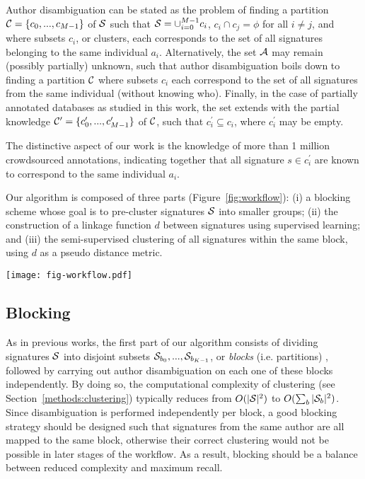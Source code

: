 \documentclass[runningheads,a4paper]{llncs}
\makeatletter
\newcommand*{\ie}{i.e.\@\xspace}
\makeatother
\begin{document}
Author disambiguation can be stated as the problem of
finding a partition ${\cal C} = \{ c_0, ..., c_{M-1} \}$ of ${\cal S}$ such
that ${\cal S} = \cup_{i=0}^{M-1} c_i$, $c_i \cap c_j = \phi$ for all $i \neq
j$, and where subsets $c_i$, or clusters, each corresponds to the set of all
signatures belonging to the same individual $a_i$. Alternatively, the set
${\cal A}$ may remain (possibly partially) unknown, such that author
disambiguation boils down to finding a partition ${\cal C}$ where
subsets $c_i$  each correspond to the set of all signatures from the same
individual (without knowing who). Finally, in the case of partially annotated databases as studied in
this work, the set extends with the partial knowledge ${\cal C}^\prime = \{ c_0^\prime, ..., c_{M-1}^\prime \}$ of ${\cal C}$,
such that $c_i^\prime \subseteq c_i$, where $c_i^\prime$ may be empty.

The distinctive aspect of our work is the
knowledge of more than 1 million crowdsourced annotations, indicating together that all signature $s \in
c_i^\prime$ are known to correspond to the same individual $a_i$.

Our algorithm is composed of three parts (Figure~\ref{fig:workflow}): (i) a blocking
scheme whose goal is to pre-cluster signatures ${\cal S}$ into smaller groups; (ii) the construction of a linkage function
$d$ between signatures using supervised learning; and (iii) the
semi-supervised clustering of all signatures within the same block, using $d$ as a pseudo distance metric.


\begin{figure*}
\centering
\texttt{[image: fig-workflow.pdf]}
\caption{Pipeline for author disambiguation: (a)
signatures are \textit{blocked} to reduce computational complexity, (b) a linkage
function is built with supervised learning, (c) independently within each block, signatures
are grouped using hierarchical agglomerative clustering.}
\label{fig:workflow}
\end{figure*}

\subsection{Blocking}
\label{methods:blocking}

As in previous works, the first part of our algorithm consists of dividing
signatures ${\cal S}$ into disjoint subsets ${\cal S}_{b_0}, ..., {\cal
S}_{b_{K-1}}$, or \textit{blocks} (\ie partitions) \cite{fellegi69}, followed by carrying out
author disambiguation on each one of these blocks independently.
By doing so, the computational complexity of clustering (see Section~\ref{methods:clustering})
typically reduces from $O(|{\cal S}|^2)$ to $O(\sum_b |{\cal S}_b|^2)$.
Since disambiguation is performed independently per block, a good blocking strategy should be
designed such that signatures from the same author are all mapped to the same
block, otherwise their correct clustering would not be possible in later stages of the workflow.
As a result, blocking should be a balance between reduced complexity and maximum recall.
\end{document}
